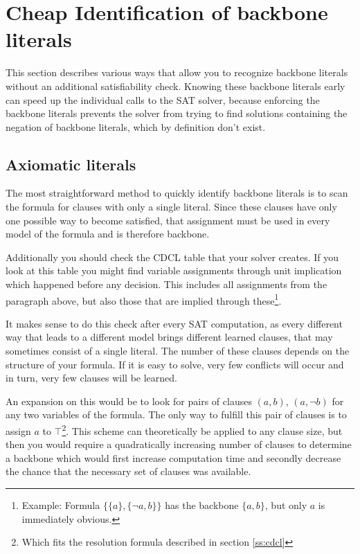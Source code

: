 \section{Cheap Identification of backbone literals}
This section describes various ways that allow you to recognize backbone literals without an additional satisfiability check. Knowing these backbone literals early can speed up the individual calls to the SAT solver, because enforcing the backbone literals prevents the solver from trying to find solutions containing the negation of backbone literals, which by definition don't exist.



\subsection{Axiomatic literals}
\label{subsec:axiomatic}
The most straightforward method to quickly identify backbone literals is to scan the formula for clauses with only a single literal. Since these clauses have only one possible way to become satisfied, that assignment must be used in every model of the formula and is therefore backbone.

Additionally you should check the CDCL table that your solver creates. If you look at this table you might find variable assignments through unit implication which happened before any decision. This includes all assignments from the paragraph above, but also those that are implied through these\footnote{Example: Formula $\{\{a\},\{\neg a, b\}\}$ has the backbone $\{a,b\}$, but only $a$ is immediately obvious.}.

It makes sense to do this check after every SAT computation, as every different way that leads to a different model brings different learned clauses, that may sometimes consist of a single literal. The number of these clauses depends on the structure of your formula. If it is easy to solve, very few conflicts will occur and in turn, very few clauses will be learned.

An expansion on this would be to look for pairs of clauses $(a,b)$, $(a,\neg b)$ for any two variables of the formula. The only way to fulfill this pair of clauses is to assign $a$ to $\top$\footnote{Which fits the resolution formula described in 
section \ref{ss:cdcl}}. This scheme can theoretically be applied to any clause size, but then you would require a quadratically increasing number of clauses to determine a backbone which would first increase computation time and secondly decrease the chance that the necessary set of clauses was available.

